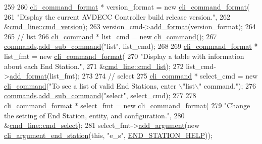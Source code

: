 \begin{DoxyCode}
259 
260     \hyperlink{classcli__command__format}{cli\_command\_format} * version\_format = \textcolor{keyword}{new} 
      \hyperlink{classcli__command__format}{cli\_command\_format}(
261         \textcolor{stringliteral}{"Display the current AVDECC Controller build release version."},
262         &\hyperlink{classcmd__line_afeb4d6d9e773d7424accff89650161f7}{cmd\_line::cmd\_version});
263     version\_cmd->\hyperlink{classcli__command_aa9ec38e761644d946f8db2b920e39921}{add\_format}(version\_format);
264 
265     \textcolor{comment}{// list}
266     \hyperlink{classcli__command}{cli\_command} * list\_cmd = \textcolor{keyword}{new} \hyperlink{classcli__command}{cli\_command}();
267     \hyperlink{classcmd__line_ae4fea670c2fdd2b60f7b5b6ad6fbaf1e}{commands}.\hyperlink{classcli__command_aa73a67e8ebb6facd4b40ced66279b226}{add\_sub\_command}(\textcolor{stringliteral}{"list"}, list\_cmd);
268 
269     \hyperlink{classcli__command__format}{cli\_command\_format} * list\_fmt = \textcolor{keyword}{new} \hyperlink{classcli__command__format}{cli\_command\_format}(
270         \textcolor{stringliteral}{"Display a table with information about each End Station."},
271         &\hyperlink{classcmd__line_a311620e4b2cb2f4f6cab8a372aa3d5f2}{cmd\_line::cmd\_list});
272     list\_cmd->\hyperlink{classcli__command_aa9ec38e761644d946f8db2b920e39921}{add\_format}(list\_fmt);
273 
274     \textcolor{comment}{// select}
275     \hyperlink{classcli__command}{cli\_command} * select\_cmd = \textcolor{keyword}{new} \hyperlink{classcli__command}{cli\_command}(\textcolor{stringliteral}{"To see a list of valid End Stations,
       enter \(\backslash\)"list\(\backslash\)" command."});
276     \hyperlink{classcmd__line_ae4fea670c2fdd2b60f7b5b6ad6fbaf1e}{commands}.\hyperlink{classcli__command_aa73a67e8ebb6facd4b40ced66279b226}{add\_sub\_command}(\textcolor{stringliteral}{"select"}, select\_cmd);
277 
278     \hyperlink{classcli__command__format}{cli\_command\_format} * select\_fmt = \textcolor{keyword}{new} \hyperlink{classcli__command__format}{cli\_command\_format}(
279         \textcolor{stringliteral}{"Change the setting of End Station, entity, and configuration."},
280         &\hyperlink{classcmd__line_a29f7f3b13e37de847ac9fb12308a1689}{cmd\_line::cmd\_select});
281     select\_fmt->\hyperlink{classcli__command__format_ac3fc6d13a227c195d5ee6f7b78eba9cd}{add\_argument}(\textcolor{keyword}{new} \hyperlink{classcli__argument__end__station}{cli\_argument\_end\_station}(\textcolor{keyword}{this}, \textcolor{stringliteral}{"e\_s"}, 
      \hyperlink{cmd__line_8cpp_a5ca225cf97165ab1d1472609c4e765f6}{END\_STATION\_HELP}));

\end{DoxyCode}
